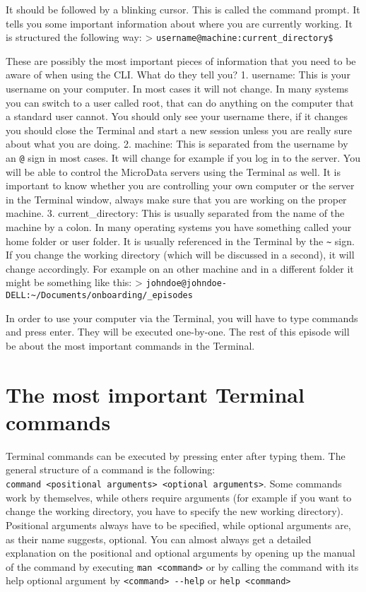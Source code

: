 \documentclass[
]{book}
\begin{document}
It should be followed by a blinking cursor. This is called the command prompt. It tells you some important information about where you are currently working. It is structured the following way:
\textgreater{} \texttt{username@machine:current\_directory\$}

These are possibly the most important pieces of information that you need to be aware of when using the CLI. What do they tell you?
1. username: This is your username on your computer. In most cases it will not change. In many systems you can switch to a user called root, that can do anything on the computer that a standard user cannot. You should only see your username there, if it changes you should close the Terminal and start a new session unless you are really sure about what you are doing.
2. machine: This is separated from the username by an \texttt{@} sign in most cases. It will change for example if you log in to the server. You will be able to control the MicroData servers using the Terminal as well. It is important to know whether you are controlling your own computer or the server in the Terminal window, always make sure that you are working on the proper machine.
3. current\_directory: This is usually separated from the name of the machine by a colon. In many operating systems you have something called your home folder or user folder. It is usually referenced in the Terminal by the \texttt{\textasciitilde{}} sign. If you change the working directory (which will be discussed in a second), it will change accordingly. For example on an other machine and in a different folder it might be something like this:
\textgreater{} \texttt{johndoe@johndoe-DELL:\textasciitilde{}/Documents/onboarding/\_episodes}

In order to use your computer via the Terminal, you will have to type commands and press enter. They will be executed one-by-one. The rest of this episode will be about the most important commands in the Terminal.

\hypertarget{the-most-important-terminal-commands}{%
\chapter{The most important Terminal commands}\label{the-most-important-terminal-commands}}

Terminal commands can be executed by pressing enter after typing them. The general structure of a command is the following:
\texttt{command\ \textless{}positional\ arguments\textgreater{}\ \textless{}optional\ arguments\textgreater{}}. Some commands work by themselves, while others require arguments (for example if you want to change the working directory, you have to specify the new working directory). Positional arguments always have to be specified, while optional arguments are, as their name suggests, optional. You can almost always get a detailed explanation on the positional and optional arguments by opening up the manual of the command by executing \texttt{man\ \textless{}command\textgreater{}} or by calling the command with its help optional argument by \texttt{\textless{}command\textgreater{}\ -\/-help} or \texttt{help\ \textless{}command\textgreater{}}
\end{document}
